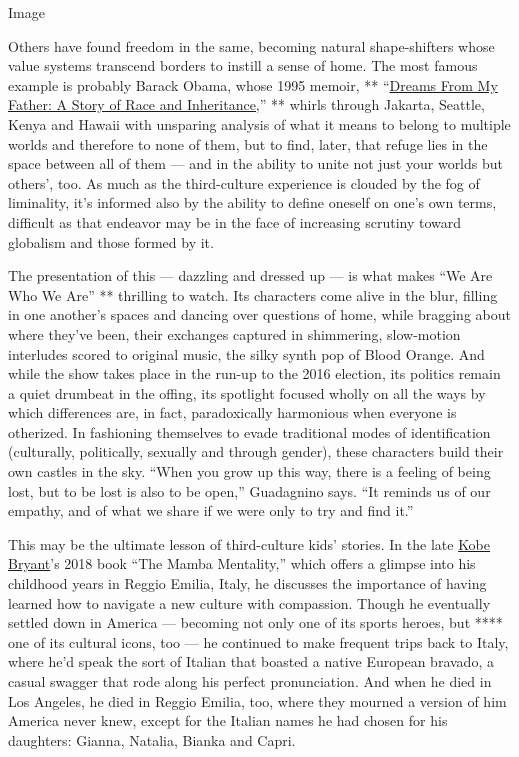 Image

Others have found freedom in the same, becoming natural shape-shifters
whose value systems transcend borders to instill a sense of home. The
most famous example is probably Barack Obama, whose 1995 memoir, **
``\href{https://www.nytimes3xbfgragh.onion/2009/01/19/books/19read.html}{Dreams
From My Father: A Story of Race and Inheritance,}'' ** whirls through
Jakarta, Seattle, Kenya and Hawaii with unsparing analysis of what it
means to belong to multiple worlds and therefore to none of them, but to
find, later, that refuge lies in the space between all of them --- and
in the ability to unite not just your worlds but others', too. As much
as the third-culture experience is clouded by the fog of liminality,
it's informed also by the ability to define oneself on one's own terms,
difficult as that endeavor may be in the face of increasing scrutiny
toward globalism and those formed by it.

The presentation of this --- dazzling and dressed up --- is what makes
``We Are Who We Are'' ** thrilling to watch. Its characters come alive
in the blur, filling in one another's spaces and dancing over questions
of home, while bragging about where they've been, their exchanges
captured in shimmering, slow-motion interludes scored to original music,
the silky synth pop of Blood Orange. And while the show takes place in
the run-up to the 2016 election, its politics remain a quiet drumbeat in
the offing, its spotlight focused wholly on all the ways by which
differences are, in fact, paradoxically harmonious when everyone is
otherized. In fashioning themselves to evade traditional modes of
identification (culturally, politically, sexually and through gender),
these characters build their own castles in the sky. ``When you grow up
this way, there is a feeling of being lost, but to be lost is also to be
open,'' Guadagnino says. ``It reminds us of our empathy, and of what we
share if we were only to try and find it.''

This may be the ultimate lesson of third-culture kids' stories. In the
late \href{https://www.nytimes3xbfgragh.onion/spotlight/kobe}{Kobe
Bryant}'s 2018 book ``The Mamba Mentality,'' which offers a glimpse into
his childhood years in Reggio Emilia, Italy, he discusses the importance
of having learned how to navigate a new culture with compassion. Though
he eventually settled down in America --- becoming not only one of its
sports heroes, but **** one of its cultural icons, too --- he continued
to make frequent trips back to Italy, where he'd speak the sort of
Italian that boasted a native European bravado, a casual swagger that
rode along his perfect pronunciation. And when he died in Los Angeles,
he died in Reggio Emilia, too, where they mourned a version of him
America never knew, except for the Italian names he had chosen for his
daughters: Gianna, Natalia, Bianka and Capri.

